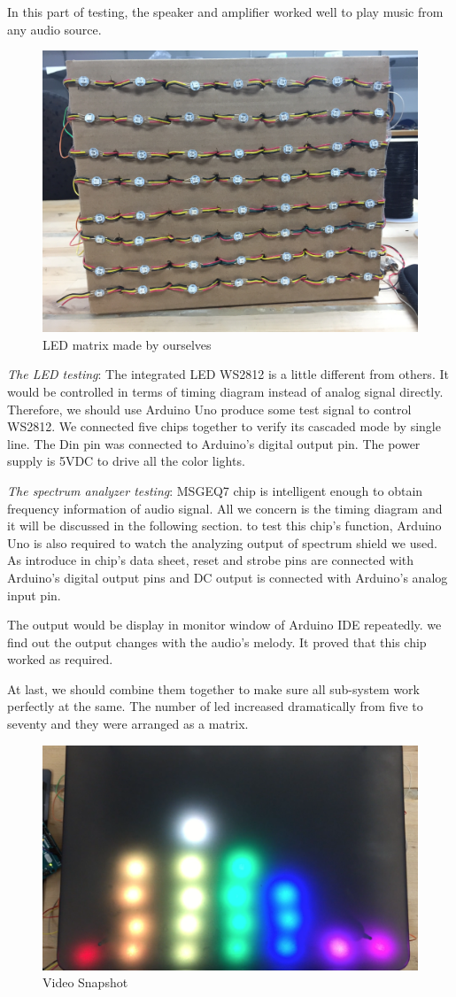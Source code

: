 \documentclass[12pt,a4paper,journal]{IEEEtran}
\begin{document}
In this part of testing, the speaker and amplifier worked well to play music from any audio source.
\begin{figure}[ht]
  \centering
  \includegraphics[width=0.7\linewidth]{ledmatrix.jpg}
  \caption{LED matrix made by ourselves}
  \label{fig:ledmat}
\end{figure}

\emph{The LED testing}: The integrated LED WS2812 is a little different from others. It would be controlled in terms of timing diagram instead of analog signal directly. Therefore, we should use Arduino Uno produce some test signal to control WS2812. We connected five chips together to verify its cascaded mode by single line. The Din pin was connected to Arduino's digital output pin. The power supply is 5VDC to drive all the color lights.

\emph{The spectrum analyzer testing}: MSGEQ7 chip is intelligent enough to obtain frequency information of audio signal. All we concern is the timing diagram and it will be discussed in the following section. to test this chip's function, Arduino Uno is also required to watch the analyzing output of spectrum shield we used. As introduce in chip's data sheet, reset and strobe pins are connected with Arduino's digital output pins and DC output is connected with Arduino's analog input pin.

The output would be display in monitor window of Arduino IDE repeatedly. we find out the output changes with the audio's melody. It proved that this chip worked as required.

At last, we should combine them together to make sure all sub-system work perfectly at the same. The number of led increased dramatically from five to seventy and they were arranged as a matrix.
\begin{figure}
  \centering
  \includegraphics[width=0.7\linewidth]{result.png}
  \caption{Video Snapshot}
\end{figure}
\end{document}
